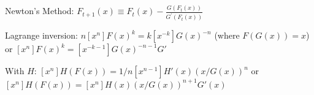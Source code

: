 Newton's Method: $F_{t+1}(x) \equiv F_{t}(x)-\frac{G\left(F_{t}(x)\right)}{G^{\prime}\left(F_{t}(x)\right)}$

Lagrange inversion: $n[x^n]F(x)^k=k[x^{-k}]G(x)^{-n}$ (where $F(G(x))=x$) or $[x^n]F(x)^k=[x^{-k-1}]G(x)^{-n-1}G'$

With $H$: $[x^n]H(F(x))=1/n [x^{n-1}]H'(x)(x/G(x))^n$ or $[x^n]H(F(x))=[x^n]H(x)(x/G(x))^{n+1}G'(x)$
